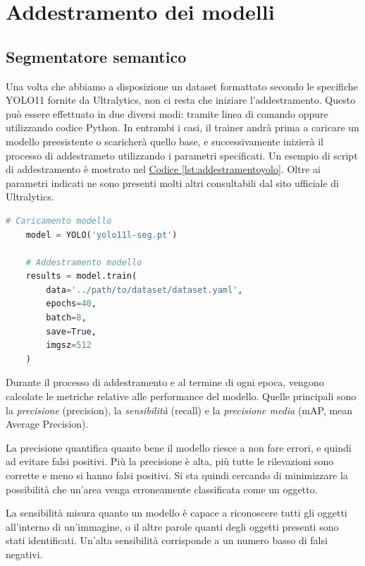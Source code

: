 \documentclass[12pt]{report}
\begin{document}
\section{Addestramento dei modelli}
\label{sec:addestramento_dei modelli}

\subsection{Segmentatore semantico}
\label{sec:addestramento_segmentatore_semantico}

Una volta che abbiamo a disposizione un dataset formattato secondo le specifiche YOLO11 fornite da Ultralytics, non ci resta che iniziare l'addestramento. Questo può essere effettuato in due diversi modi: tramite linea di comando oppure utilizzando codice Python. In entrambi i casi, il trainer andrà prima a caricare un modello preesistente o scaricherà quello base, e successivamente inizierà il processo di addestrameto utilizzando i parametri specificati. Un esempio di script di addestramento è mostrato nel \hyperref[lst:addestramentoyolo]{Codice \ref{lst:addestramentoyolo}}. Oltre ai parametri indicati ne sono presenti molti altri consultabili dal sito ufficiale di Ultralytics.

\lstset{style=pythonstyle}
\begin{lstlisting}[language=Python, caption={Addestramento del modello YOLO11.}, label={lst:addestramentoyolo}, float]
	# Caricamento modello
	model = YOLO('yolo11l-seg.pt')
	
	# Addestramento modello
	results = model.train(
		data='../path/to/dataset/dataset.yaml',
		epochs=40,
		batch=8,
		save=True,
		imgsz=512
	)
\end{lstlisting}

Durante il processo di addestramento e al termine di ogni epoca, vengono calcolate le metriche relative alle performance del modello. Quelle principali sono la \textit{precisione} (precision), la \textit{sensibilità} (recall) e la \textit{precisione media} (mAP, mean Average Precision).

La precisione quantifica quanto bene il modello riesce a non fare errori, e quindi ad evitare falsi positivi. Più la precisione è alta, più tutte le rilevazioni sono corrette e meno si hanno falsi positivi. Si sta quindi cercando di minimizzare la possibilità che un'area venga erroneamente classificata come un oggetto.

La sensibilità misura quanto un modello è capace a riconoscere tutti gli oggetti all'interno di un'immagine, o il altre parole quanti degli oggetti presenti sono stati identificati. Un'alta sensibilità corrisponde a un numero basso di falsi negativi.
\end{document}
